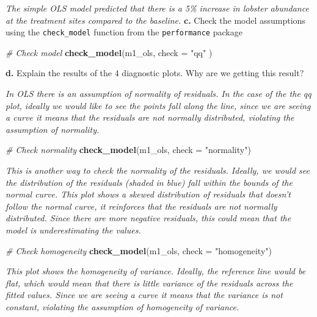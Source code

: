 \documentclass[
]{article}
\newenvironment{Shaded}{\begin{snugshade}}{\end{snugshade}}
\newcommand{\AttributeTok}[1]{\textcolor[rgb]{0.13,0.29,0.53}{#1}}
\newcommand{\CommentTok}[1]{\textcolor[rgb]{0.56,0.35,0.01}{\textit{#1}}}
\newcommand{\FunctionTok}[1]{\textcolor[rgb]{0.13,0.29,0.53}{\textbf{#1}}}
\newcommand{\NormalTok}[1]{#1}
\newcommand{\StringTok}[1]{\textcolor[rgb]{0.31,0.60,0.02}{#1}}
\begin{document}
\emph{The simple OLS model predicted that there is a 5\% increase in
lobster abundance at the treatment sites compared to the baseline.}
\textbf{c.} Check the model assumptions using the \texttt{check\_model}
function from the \texttt{performance} package

\begin{Shaded}
\begin{Highlighting}[]
\CommentTok{\# Check model}
\FunctionTok{check\_model}\NormalTok{(m1\_ols,  }\AttributeTok{check =} \StringTok{"qq"}\NormalTok{ )}
\end{Highlighting}
\end{Shaded}

\textbf{d.} Explain the results of the 4 diagnostic plots. Why are we
getting this result?

\emph{In OLS there is an assumption of normality of residuals. In the
case of the the qq plot, ideally we would like to see the points fall
along the line, since we are seeing a curve it means that the residuals
are not normally distributed, violating the assumption of normality.}

\begin{Shaded}
\begin{Highlighting}[]
\CommentTok{\# Check normality}
\FunctionTok{check\_model}\NormalTok{(m1\_ols, }\AttributeTok{check =} \StringTok{"normality"}\NormalTok{)}
\end{Highlighting}
\end{Shaded}

\emph{This is another way to check the normality of the residuals.
Ideally, we would see the distribution of the residuals (shaded in blue)
fall within the bounds of the normal curve. This plot shows a skewed
distribution of residuals that doesn't follow the normal curve, it
reinforces that the residuals are not normally distributed. Since there
are more negative residuals, this could mean that the model is
underestimating the values.}

\begin{Shaded}
\begin{Highlighting}[]
\CommentTok{\# Check homogeneity}
\FunctionTok{check\_model}\NormalTok{(m1\_ols, }\AttributeTok{check =} \StringTok{"homogeneity"}\NormalTok{)}
\end{Highlighting}
\end{Shaded}

\emph{This plot shows the homogeneity of variance. Ideally, the
reference line would be flat, which would mean that there is little
variance of the residuals across the fitted values. Since we are seeing
a curve it means that the variance is not constant, violating the
assumption of homogeneity of variance.}
\end{document}
